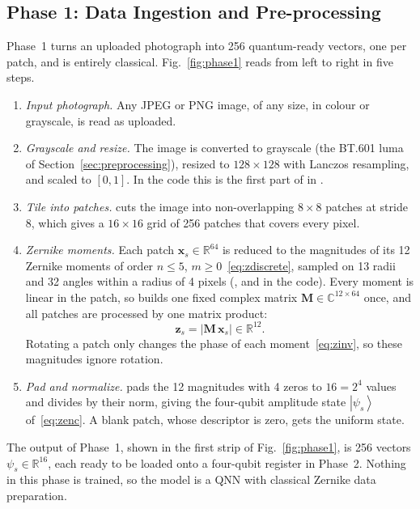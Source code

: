 \documentclass[conference]{IEEEtran}
\newcommand{\ket}[1]{\left|#1\right\rangle}
\begin{document}
\subsection{Phase 1: Data Ingestion and Pre-processing}\label{sec:phase1}
Phase~1 turns an uploaded photograph into 256 quantum-ready vectors, one per patch, and is entirely classical. Fig.~\ref{fig:phase1} reads from left to right in five steps.
\begin{enumerate}
\item \emph{Input photograph.} Any JPEG or PNG image, of any size, in colour or grayscale, is read as uploaded.
\item \emph{Grayscale and resize.} The image is converted to grayscale (the BT.601 luma of Section~\ref{sec:preprocessing}), resized to $128\times128$ with Lanczos resampling, and scaled to $[0,1]$. In the code this is the first part of  in .
\item \emph{Tile into patches.}  cuts the image into non-overlapping $8\times8$ patches at stride 8, which gives a $16\times16$ grid of 256 patches that covers every pixel.
\item \emph{Zernike moments.} Each patch $\mathbf{x}_s\in\mathbb{R}^{64}$ is reduced to the magnitudes of its 12 Zernike moments of order $n\le5$, $m\ge0$~\eqref{eq:zdiscrete}, sampled on 13 radii and 32 angles within a radius of 4 pixels (,  and  in the code). Every moment is linear in the patch, so  builds one fixed complex matrix $\mathbf{M}\in\mathbb{C}^{12\times64}$ once, and all patches are processed by one matrix product:
\begin{equation}
\mathbf{z}_s = \left|\mathbf{M}\,\mathbf{x}_s\right| \in \mathbb{R}^{12}.
\label{eq:zmatrix}
\end{equation}
Rotating a patch only changes the phase of each moment~\eqref{eq:zinv}, so these magnitudes ignore rotation.
\item \emph{Pad and normalize.}  pads the 12 magnitudes with 4 zeros to $16 = 2^4$ values and divides by their norm, giving the four-qubit amplitude state $\ket{\psi_s}$ of~\eqref{eq:zenc}. A blank patch, whose descriptor is zero, gets the uniform state.
\end{enumerate}
The output of Phase~1, shown in the first strip of Fig.~\ref{fig:phase1}, is 256 vectors $\psi_s\in\mathbb{R}^{16}$, each ready to be loaded onto a four-qubit register in Phase~2. Nothing in this phase is trained, so the model is a QNN with classical Zernike data preparation.
\end{document}
